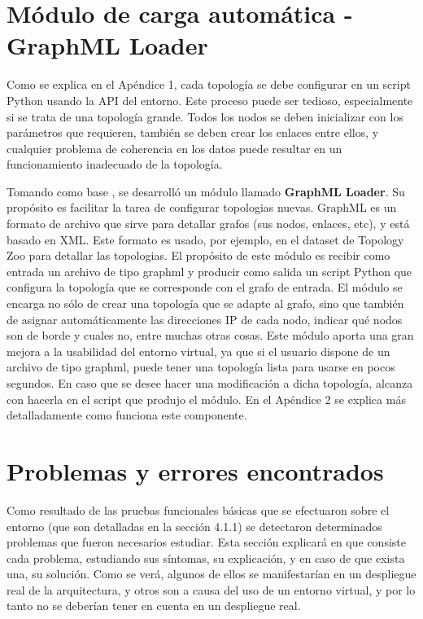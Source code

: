 \section{Módulo de carga automática - GraphML Loader}
Como se explica en el Apéndice 1, cada topología se debe configurar en un script Python usando la API del entorno. Este proceso puede ser tedioso, especialmente si se trata de una topología grande. Todos los nodos se deben inicializar con los parámetros que requieren, también se deben crear los enlaces entre ellos, y cualquier problema de coherencia en los datos puede resultar en un funcionamiento inadecuado de la topología.

Tomando como base \cite{auto-mininet}, se desarrolló un módulo llamado \textbf{GraphML Loader}. Su propósito es facilitar la tarea de configurar topologias nuevas. GraphML es un formato de archivo que sirve para detallar grafos (sus nodos, enlaces, etc), y está basado en XML. Este formato es usado, por ejemplo, en el dataset de Topology Zoo \cite{topology-zoo} para detallar las topologias. El propósito de este módulo es recibir como entrada un archivo de tipo graphml y producir como salida un script Python que configura la topología que se corresponde con el grafo de entrada. El módulo se encarga no sólo de crear una topología que se adapte al grafo, sino que también de asignar automáticamente las direcciones IP de cada nodo, indicar qué nodos son de borde y cuales no, entre muchas otras cosas. Este módulo aporta una gran mejora a la usabilidad del entorno virtual, ya que si el usuario dispone de un archivo de tipo graphml, puede tener una topología lista para usarse en pocos segundos. En caso que se desee hacer una modificación a dicha topología, alcanza con hacerla en el script que produjo el módulo. En el Apéndice 2 se explica más detalladamente como funciona este componente.


\section{Problemas y errores encontrados}
Como resultado de las pruebas funcionales básicas que se efectuaron sobre el entorno (que son detalladas en la sección 4.1.1) se detectaron determinados problemas que fueron necesarios estudiar. Esta sección explicará en que consiste cada problema, estudiando sus síntomas, su explicación, y en caso de que exista una, su solución. Como se verá, algunos de ellos se manifestarían en un despliegue real de la arquitectura, y otros son a causa del uso de un entorno virtual, y por lo tanto no se deberían tener en cuenta en un despliegue real.

